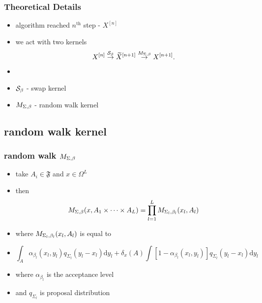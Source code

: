 \begin{frame}
		\frametitle{ Theoretical Details }

	\begin{itemize}
		\item[] algorithm reached $n^\text{th}$ step - $X^{[n]}$
		\item[] we act with two kernels
 $$X^{[n]} \overset{\mathcal{S}_{\beta}}{\rightarrow} \widetilde{X}^{[n +1]} \overset{M_{\Sigma,\beta}}{\rightarrow} X^{[n + 1]}.$$
		
		\item[]
		\item $\mathcal{S}_{\beta}$ - swap kernel
		\item $M_{\Sigma,\beta}$ - random walk kernel
	\end{itemize}

\end{frame}
		\subsection{random walk kernel}

\begin{frame}
		\frametitle{ random walk $M_{\Sigma,\beta}$ }

	\begin{itemize}
		\item[] take $A_i \in \mathfrak{F}$ and $x \in \Omega^L$
		\item[] then
  $$M_{\Sigma,\beta} (x, A_1 \times \dots \times A_L) = \prod_{l=1}^L M_{\Sigma_{l},\beta_{l}}(x_l, A_l)$$
		
		\item[] where $M_{\Sigma_{l},\beta_{l}}(x_l, A_l)$ is equal to  
		\item[] 
$$\int_A \alpha_{\beta_l} (x_l, y_l) q_{\Sigma_l} (y_l - x_l) \mathrm{d }y_l + \delta_x (A) \int [1 - \alpha_{\beta_l} (x_l, y_l)] q_{\Sigma_l} (y_l - x_l) \mathrm{d }y_l$$

		\item[] where $\alpha_{\beta_l}$ is the acceptance level 
		\item[] and $q_{\Sigma_l}$ is proposal distribution 
	\end{itemize}

\end{frame}

